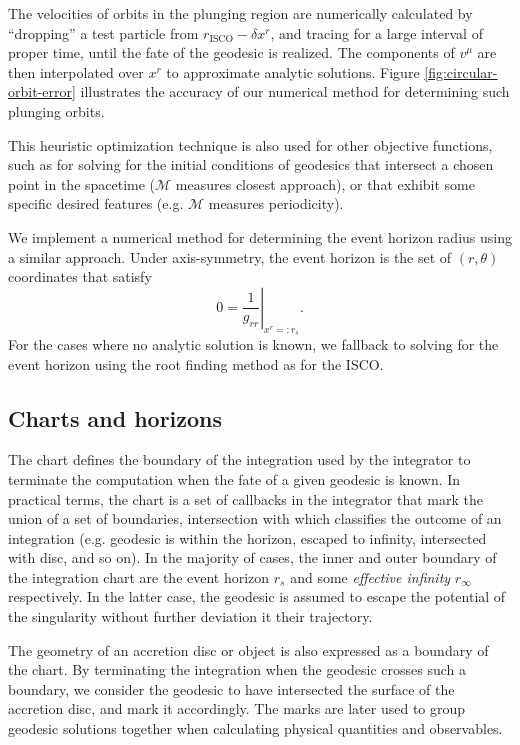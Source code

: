 \documentclass[fleqn,usenatbib]{mnras}
\newcommand{\risco}{r_\text{ISCO}}
\begin{document}
The velocities of orbits in the plunging region are numerically calculated by
``dropping'' a test particle from $\risco -  \delta x^r$, and tracing for a
large interval of proper time, until the fate of the geodesic is realized. The
components of $v^\mu$ are then interpolated over $x^r$ to approximate analytic
solutions. Figure \ref{fig:circular-orbit-error} illustrates the accuracy of our
numerical method for determining such plunging orbits.

This heuristic optimization technique is also used for other objective
functions, such as for solving for the initial conditions of  geodesics that
intersect a chosen point in the spacetime ($\mathscr{M}$ measures closest
approach), or that exhibit some specific desired features (e.g. $\mathscr{M}$
measures periodicity).

We implement a numerical method for determining the event horizon radius using a
similar approach. Under axis-symmetry, the event horizon is the set of $(r,
\theta)$ coordinates that satisfy
\begin{equation}
    \label{eq:event_horizon}
    0 = \left. \frac{1}{g_{rr}} \right\rvert_{x^r =: r_s}.
\end{equation}
For the cases where no analytic solution is known, we fallback to solving for
the event horizon using the root finding method as for the ISCO.

\subsection{Charts and horizons}

The chart defines the boundary of the integration used by the integrator to
terminate the computation when the fate of a given geodesic is known. In
practical terms, the chart is a set of callbacks in the integrator that mark the
union of a set of boundaries, intersection with which classifies the outcome of
an integration (e.g. geodesic is within the horizon, escaped to infinity,
intersected with disc, and so on). In the majority of cases, the inner and outer
boundary of the integration chart are the event horizon $r_s$ and some
\emph{effective infinity} $r_\infty$ respectively. In the latter case, the
geodesic is assumed to escape the potential of the singularity without further
deviation it their trajectory.

The geometry of an accretion disc or object is also expressed as a boundary of
the chart. By terminating the integration when the geodesic crosses such a
boundary, we consider the geodesic to have intersected the surface of the
accretion disc, and mark it accordingly. The marks are later used to group
geodesic solutions together when calculating physical quantities and
observables.
\end{document}
